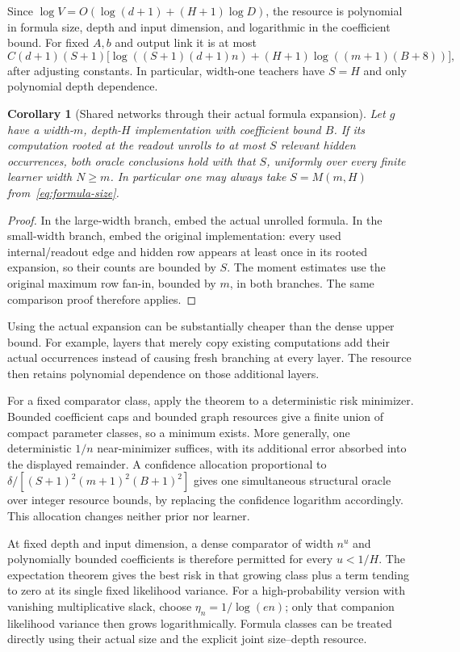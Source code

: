 \documentclass[11pt]{article}
\newtheorem{corollary}[theorem]{Corollary}\newtheorem{proposition}[theorem]{Proposition}
\theoremstyle{remark}\newtheorem{remark}[theorem]{Remark}
\begin{document}
Since $\log V=O(\log(d+1)+(H+1)\log D)$, the resource is polynomial in formula size, depth and input dimension, and logarithmic in the coefficient bound. For fixed $A,b$ and output link it is at most
\[
 C(d+1)(S+1)\big[
   \log((S+1)(d+1)n)+(H+1)\log((m+1)(B+8))
 \big],
\]
after adjusting constants. In particular, width-one teachers have $S=H$ and only polynomial depth dependence.

\begin{corollary}[Shared networks through their actual formula expansion]\label{cor:dense}
Let $g$ have a width-$m$, depth-$H$ implementation with coefficient bound $B$. If its computation rooted at the readout unrolls to at most $S$ relevant hidden occurrences, both oracle conclusions hold with that $S$, uniformly over every finite learner width $N\ge m$. In particular one may always take $S=M(m,H)$ from~\eqref{eq:formula-size}.
\end{corollary}
\begin{proof}
In the large-width branch, embed the actual unrolled formula. In the small-width branch, embed the original implementation: every used internal/readout edge and hidden row appears at least once in its rooted expansion, so their counts are bounded by $S$. The moment estimates use the original maximum row fan-in, bounded by $m$, in both branches. The same comparison proof therefore applies.
\end{proof}

Using the actual expansion can be substantially cheaper than the dense upper bound. For example, layers that merely copy existing computations add their actual occurrences instead of causing fresh branching at every layer. The resource then retains polynomial dependence on those additional layers.

For a fixed comparator class, apply the theorem to a deterministic risk minimizer. Bounded coefficient caps and bounded graph resources give a finite union of compact parameter classes, so a minimum exists. More generally, one deterministic $1/n$ near-minimizer suffices, with its additional error absorbed into the displayed remainder. A confidence allocation proportional to
$\delta/[(S+1)^2(m+1)^2(B+1)^2]$ gives one simultaneous structural oracle over integer resource bounds, by replacing the confidence logarithm accordingly. This allocation changes neither prior nor learner.

At fixed depth and input dimension, a dense comparator of width $n^u$ and polynomially bounded coefficients is therefore permitted for every $u<1/H$. The expectation theorem gives the best risk in that growing class plus a term tending to zero at its single fixed likelihood variance. For a high-probability version with vanishing multiplicative slack, choose $\eta_n=1/\log(en)$; only that companion likelihood variance then grows logarithmically. Formula classes can be treated directly using their actual size and the explicit joint size--depth resource.
\end{document}
